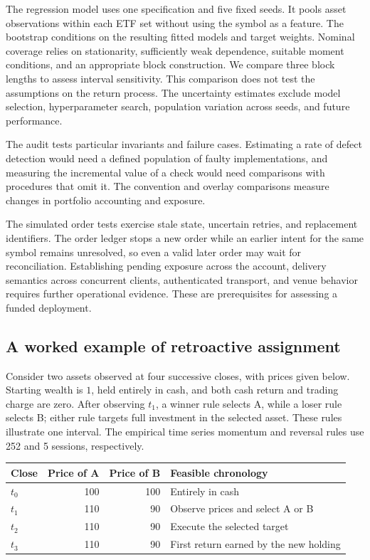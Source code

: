 \documentclass{article}
\begin{document}
The regression model uses one specification and five fixed seeds. It pools asset observations within each ETF set without using the symbol as a feature. The bootstrap conditions on the resulting fitted models and target weights. Nominal coverage relies on stationarity, sufficiently weak dependence, suitable moment conditions, and an appropriate block construction. We compare three block lengths to assess interval sensitivity. This comparison does not test the assumptions on the return process. The uncertainty estimates exclude model selection, hyperparameter search, population variation across seeds, and future performance.

The audit tests particular invariants and failure cases. Estimating a rate of defect detection would need a defined population of faulty implementations, and measuring the incremental value of a check would need comparisons with procedures that omit it. The convention and overlay comparisons measure changes in portfolio accounting and exposure.

The simulated order tests exercise stale state, uncertain retries, and replacement identifiers. The order ledger stops a new order while an earlier intent for the same symbol remains unresolved, so even a valid later order may wait for reconciliation. Establishing pending exposure across the account, delivery semantics across concurrent clients, authenticated transport, and venue behavior requires further operational evidence. These are prerequisites for assessing a funded deployment.

\subsection{A worked example of retroactive assignment}
\label{app:timing-example}

Consider two assets observed at four successive closes, with prices given below. Starting wealth is $1$, held entirely in cash, and both cash return and trading charge are zero. After observing $t_1$, a winner rule selects A, while a loser rule selects B; either rule targets full investment in the selected asset. These rules illustrate one interval. The empirical time series momentum and reversal rules use 252 and 5 sessions, respectively.

\begin{center}
  \begin{tabular}{@{}lrrl@{}}
    \toprule
    Close & Price of A & Price of B & Feasible chronology \\
    \midrule
    $t_0$ & 100 & 100 & Entirely in cash \\
    $t_1$ & 110 & 90 & Observe prices and select A or B \\
    $t_2$ & 110 & 90 & Execute the selected target \\
    $t_3$ & 110 & 90 & First return earned by the new holding \\
    \bottomrule
  \end{tabular}
\end{center}
\end{document}
